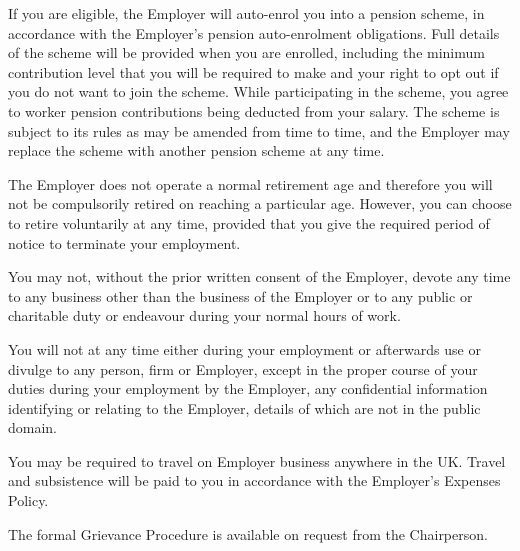 \documentclass[a4paper,11pt,onecolumn ]{article}
\begin{document}
\begin{legal}
\item {}
\begin{legal}
  \item If you are eligible, the Employer will auto-enrol you into a pension scheme, in
accordance with the Employer’s pension auto-enrolment obligations.
Full details of the scheme will be provided when you are enrolled, including the
minimum contribution level that you will be required to make and your right to
opt out if you do not want to join the scheme. While participating in the scheme,
you agree to worker pension contributions being deducted from your salary.
The scheme is subject to its rules as may be amended from time to time, and the
Employer may replace the scheme with another pension scheme at any time.
\end{legal}

\item {}
The Employer does not operate a normal retirement age and therefore you will not
be compulsorily retired on reaching a particular age. However, you can choose to
retire voluntarily at any time, provided that you give the required period of notice to
terminate your employment.

\item {}
\begin{legal}
\item You may not, without the prior written consent of the Employer, devote any
time to any business other than the business of the Employer or to any
public or charitable duty or endeavour during your normal hours of work.
\item You will not at any time either during your employment or afterwards use
or divulge to any person, firm or Employer, except in the proper course of
your duties during your employment by the Employer, any confidential
information identifying or relating to the Employer, details of which are not
in the public domain.
\end{legal}

\item {}
You may be required to travel on Employer business anywhere in the UK. Travel
and subsistence will be paid to you in accordance with the Employer’s Expenses
Policy.

\item {}
The formal Grievance Procedure is available on request from the Chairperson.


\end{legal}
\end{document}

